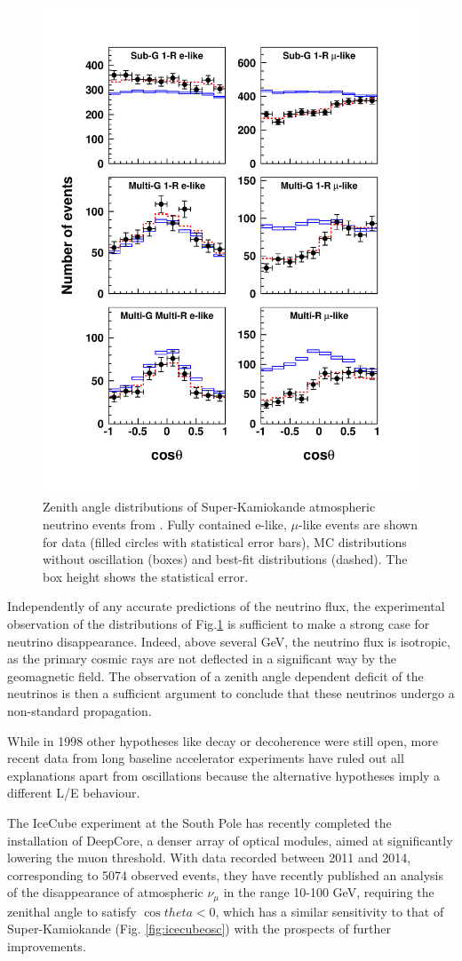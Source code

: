 \documentclass[preprint,12pt]{elsarticle}
\begin{document}
\begin{figure}[htbp]
\centering
\includegraphics[width=0.6\linewidth]{figures/sk-2006-atm.pdf}
  \caption{Zenith angle distributions of Super-Kamiokande atmospheric neutrino events from \cite{ref:sk-atm-2006}. Fully contained
e-like, $\mu$-like events
are shown for data (filled circles with statistical
error bars), MC distributions without oscillation (boxes)
and
best-fit distributions (dashed). The box height shows the
statistical error.}
 \label{fig:sk-atm}
 \end{figure}

Independently of any accurate predictions of the neutrino flux, the experimental observation of the distributions of Fig.\ref{fig:sk-atm} is sufficient to make a strong case for neutrino disappearance. Indeed, above several GeV, the neutrino flux is isotropic, as the primary cosmic rays are not deflected in a significant way by the geomagnetic field. The observation of a zenith angle dependent deficit of the neutrinos is then a sufficient argument to conclude that these neutrinos undergo a non-standard propagation.  

While in 1998 other hypotheses like decay or decoherence were still open, more recent data from long baseline accelerator experiments have ruled out all explanations apart from oscillations because the alternative hypotheses imply a different L/E behaviour. 
    
The IceCube experiment at the South Pole has recently completed the installation of DeepCore, a denser array of optical modules, aimed at significantly lowering the muon threshold. With data recorded between 2011 and 2014, corresponding to 5074 observed events, they have recently published an analysis of the disappearance of atmospheric $\nu_\mu$  \cite{ref:icecubedis} in the range 10-100 GeV, requiring the zenithal angle to satisfy $\cos theta < 0$,  which has a similar sensitivity to that of Super-Kamiokande (Fig. \ref{fig:icecubeosc}) with the prospects of further improvements. 
\end{document}
